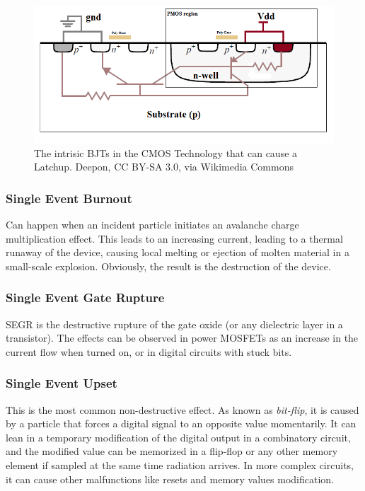 \begin{figure}[H]
\centering
\includegraphics[width=0.8\linewidth]{images/chapter2/Latchup.png}
\caption{The intrisic BJTs in the CMOS Technology that can cause a Latchup. Deepon, CC BY-SA 3.0, via Wikimedia Commons}
\label{fig:latchup}
\end{figure}

\subsubsection{Single Event Burnout}
Can happen when an incident particle initiates an avalanche charge multiplication effect. This leads to an increasing current, leading to a thermal runaway of the device, causing local melting or ejection of molten material in a small-scale explosion. Obviously, the result is the destruction of the device. \bigskip

\subsubsection{Single Event Gate Rupture}
SEGR is the destructive rupture of the gate oxide (or any dielectric layer in a transistor). The effects can be observed in power MOSFETs as an increase in the current flow when turned on, or in digital circuits with stuck bits. 

\subsubsection{Single Event Upset}
This is the most common non-destructive effect. As known as \textit{bit-flip}, it is caused by a particle that forces a digital signal to an opposite value momentarily. It can lean in a temporary modification of the digital output in a combinatory circuit, and the modified value can be memorized in a flip-flop or any other memory element if sampled at the same time radiation arrives. In more complex circuits, it can cause other malfunctions like resets and memory values modification. \bigskip


